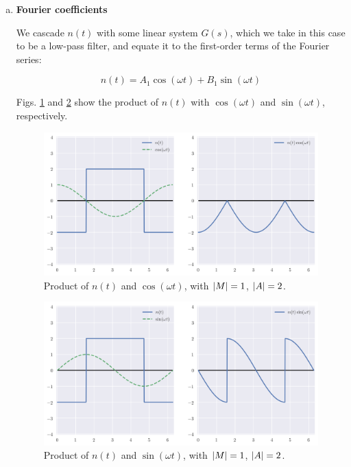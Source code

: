 \documentclass[12pt,a4paper]{article}
\begin{document}
\begin{enumerate}[a)]
\item \textbf{Fourier coefficients}

We cascade $n(t)$ with some linear system $G(s)$, which we take in this case to be a low-pass filter, and equate it to the first-order terms of the Fourier series:

\begin{equation}
	n(t) = A_1 \cos(\omega t) + B_1 \sin(\omega t)
\end{equation}

Figs. \ref{fig:prod-ncos} and \ref{fig:prod-nsin} show the product of $n(t)$ with $\cos(\omega t)$ and $\sin(\omega t)$, respectively.

\begin{figure}[h!]
	\centering
	\includegraphics[width=\linewidth]{LE3_prod-ncos.png}
	\caption{Product of $n(t)$ and $\cos(\omega t)$, with $\abs{M} = 1$, $\abs{A} = 2$.}
	\label{fig:prod-ncos}
\end{figure}

\begin{figure}[h!]
	\centering
	\includegraphics[width=\linewidth]{LE3_prod-nsin.png}
	\caption{Product of $n(t)$ and $\sin(\omega t)$, with $\abs{M} = 1$, $\abs{A} = 2$.}
	\label{fig:prod-nsin}
\end{figure}


\end{enumerate}
\end{document}
